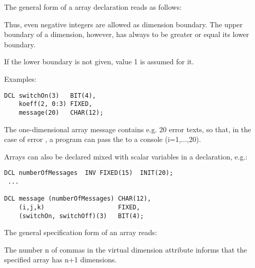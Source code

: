 The general form of a array declaration reads as follows:

\begin{grammarframe}
 




\end{grammarframe}

Thus, even negative integers are allowed as dimension boundary. The
upper boundary of a dimension, however, has always to be greater or
equal its lower boundary.

If the lower boundary is not given, value 1 is assumed for it.


Examples:

\begin{lstlisting}
DCL switchOn(3)   BIT(4),
    koeff(2, 0:3) FIXED,
    message(20)   CHAR(12);
\end{lstlisting}

The one-dimensional array message contains e.g. 20 error texts, so that,
in the case of error , a program can pass the 
 to a console
(i=1,...,20).

Arrays can also be declared mixed with scalar variables in a declaration,
e.g.:

\begin{lstlisting}
DCL numberOfMessages  INV FIXED(15)  INIT(20);
 ...

DCL message (numberOfMessages) CHAR(12),
    (i,j,k)                    FIXED,
    (switchOn, switchOff)(3)   BIT(4);
\end{lstlisting}

The general specification form of an array reads:

\begin{grammarframe}



\end{grammarframe}

The number n of commas in the virtual dimension attribute informs that
the specified array has n+1 dimensions.

